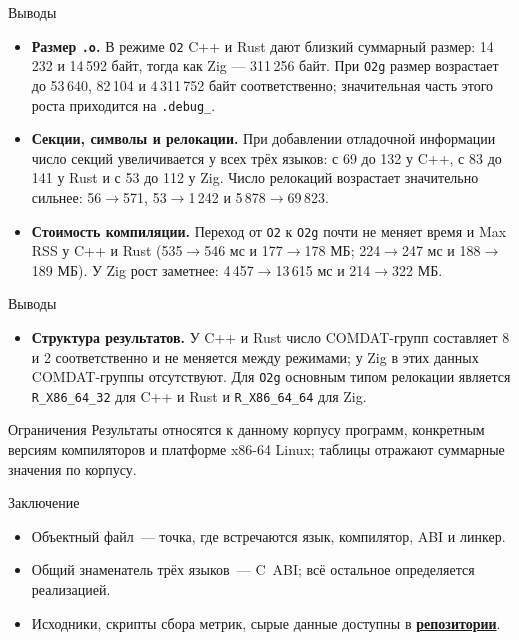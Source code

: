 \documentclass[aspectratio=169,11pt]{beamer}
\begin{document}
\begin{frame}{Выводы}
  \begin{itemize}

    \item \textbf{Размер \texttt{.o}.}
    В режиме \texttt{O2} C++ и Rust дают близкий суммарный размер:
    14\,232 и 14\,592 байт, тогда как Zig --- 311\,256 байт.
    При \texttt{O2g} размер возрастает до 53\,640, 82\,104 и
    4\,311\,752 байт соответственно; значительная часть этого роста
    приходится на \texttt{.debug\_\*}.

    \item \textbf{Секции, символы и релокации.}
    При добавлении отладочной информации число секций увеличивается
    у всех трёх языков: с 69 до 132 у C++, с 83 до 141 у Rust
    и с 53 до 112 у Zig.
    Число релокаций возрастает значительно сильнее:
    56$\rightarrow$571, 53$\rightarrow$1\,242 и
    5\,878$\rightarrow$69\,823.

    \item \textbf{Стоимость компиляции.}
    Переход от \texttt{O2} к \texttt{O2g} почти не меняет время
    и Max RSS у C++ и Rust
    (535$\rightarrow$546 мс и 177$\rightarrow$178 МБ;
    224$\rightarrow$247 мс и 188$\rightarrow$189 МБ).
    У Zig рост заметнее: 4\,457$\rightarrow$13\,615 мс
    и 214$\rightarrow$322 МБ.

  \end{itemize}
\end{frame}

\begin{frame}{Выводы}
  \begin{itemize}
    \item \textbf{Структура результатов.}
    У C++ и Rust число COMDAT-групп составляет 8 и 2 соответственно
    и не меняется между режимами; у Zig в этих данных COMDAT-группы
    отсутствуют.
    Для \texttt{O2g} основным типом релокации является
    \texttt{R\_X86\_64\_32} для C++ и Rust и
    \texttt{R\_X86\_64\_64} для Zig.
  \end{itemize}
    \begin{alertblock}{Ограничения}
    Результаты относятся к данному корпусу программ, конкретным версиям
    компиляторов и платформе x86-64 Linux; таблицы отражают суммарные
    значения по корпусу.
  \end{alertblock}
\end{frame}


\begin{frame}{Заключение}
  \begin{itemize}
    \item Объектный файл~--- точка, где встречаются язык, компилятор, ABI и линкер.
    \item Общий знаменатель трёх языков~--- C~ABI; всё остальное определяется реализацией.
    \item Исходники, скрипты сбора метрик, сырые данные доступны в \textbf{\href{https://github.com/InfernalKn1ght/cpp-object-files-talk}{репозитории}}.
  \end{itemize}
  \vfill
\end{frame}
\end{document}
